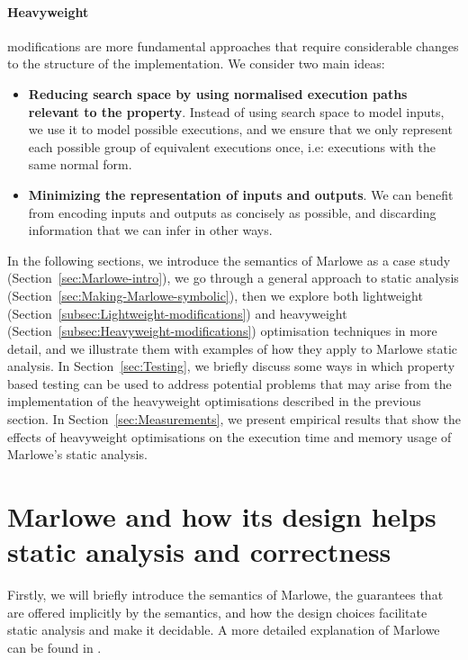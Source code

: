 \documentclass[english,runningheads]{llncs}
\begin{document}
\paragraph*{Heavyweight}

modifications are more fundamental approaches that require considerable
changes to the structure of the implementation. We consider two main ideas:
\begin{itemize}
\item \textbf{Reducing search space by using normalised execution paths relevant
to the property}. Instead of using search space to model inputs, we
use it to model possible executions, and we ensure that we only
represent each possible group of equivalent executions once, i.e:
executions with the same normal form.
\item \textbf{Minimizing the representation of inputs and outputs}. We can benefit
from encoding inputs and outputs as concisely as possible, and discarding
information that we can infer in other ways.
\end{itemize}
In the following sections, we introduce the semantics of Marlowe as
a case study (Section~\ref{sec:Marlowe-intro}), we go through a
general approach to static analysis (Section~\ref{sec:Making-Marlowe-symbolic}),
then we explore both lightweight (Section~\ref{subsec:Lightweight-modifications})
and heavyweight (Section~\ref{subsec:Heavyweight-modifications})
optimisation techniques in more detail, and we illustrate them with
examples of how they apply to Marlowe static analysis. In Section~\ref{sec:Testing},
we briefly discuss some ways in which property based testing can be
used to address potential problems that may arise from the implementation
of the heavyweight optimisations described in the previous section.
In Section~\ref{sec:Measurements}, we present empirical results that
show the effects of heavyweight optimisations on the execution time
and memory usage of Marlowe's static analysis.

\section{Marlowe and how its design helps static analysis and correctness\label{sec:Marlowe-intro} }

Firstly, we will briefly introduce the semantics of Marlowe, the guarantees
that are offered implicitly by the semantics, and how the design choices
facilitate static analysis and make it decidable. A more detailed
explanation of Marlowe can be found in \cite{marlowe}.
\end{document}
